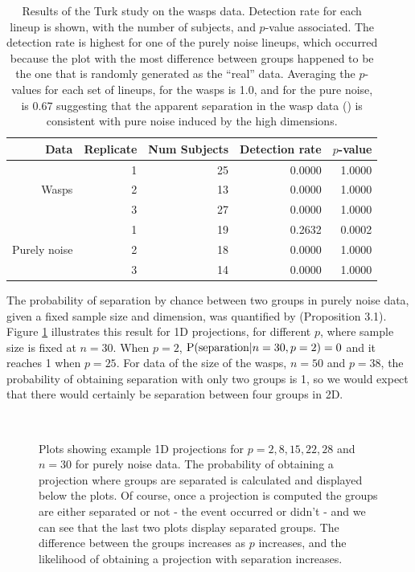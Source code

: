 \begin{table}[ht]
\begin{center}
\caption{Results of the Turk study on the wasps data. Detection rate for each lineup is shown, with the number of subjects, and $p$-value associated. The detection rate is highest for one of the purely noise lineups, which occurred because the plot with the most difference between groups happened to be the one that is randomly generated as the ``real'' data. Averaging the $p$-values for each set of lineups, for the wasps is 1.0, and for the pure noise, is 0.67 suggesting that the apparent separation in the wasp data (\cite{toth:2010}) is consistent with pure noise induced by the high dimensions.}
\vspace{0.15cm}
\begin{tabular}{r|r|r|rr}
\hline
  \hline
 Data & Replicate & Num Subjects & Detection rate & $p$-value\\ 
  \hline
  & 1 & 25 & 0.0000 &  1.0000\\
Wasps & 2 & 13 & 0.0000 &  1.0000\\ 
 & 3 & 27 & 0.0000 &  1.0000\\
 \hline
 & 1 & 19 & 0.2632 &  0.0002\\
Purely noise & 2 & 18 & 0.0000 &  1.0000 \\ 
 & 3 & 14 & 0.0000 &  1.0000\\
   \hline
\end{tabular}
\label{wasp}
\end{center}
\end{table}

The probability of separation by chance between two groups in purely noise data, given a fixed sample size and dimension,  was quantified by \cite{ripley:1996} (Proposition 3.1). Figure \ref{dist_1d} illustrates this result for 1D projections, for different $p$, where sample size is fixed at $n = 30$. When $p = 2$, $\hbox{P(separation}|n = 30, p = 2) = 0$ and it reaches 1 when $p = 25$. For data of the size of the wasps, $n = 50$ and $p = 38$, the probability of obtaining separation with only two groups is 1, so we would expect that there would certainly be separation between four groups in 2D.

\begin{figure}[htbp]
\centering
\mbox{\quad
{}\quad
{}\quad
{}\quad
{}}
\caption{Plots showing example 1D projections for $p=2, 8, 15, 22, 28$ and $n = 30$ for purely noise data. The probability of obtaining a projection where groups are separated is calculated and displayed below the plots. Of course, once a projection is computed the groups are either separated or not - the event occurred or didn't - and we can see that the last two plots display separated groups. The difference between the groups increases as $p$ increases, and the likelihood of obtaining a projection with separation increases.} 
\label{dist_1d}
\end{figure}

